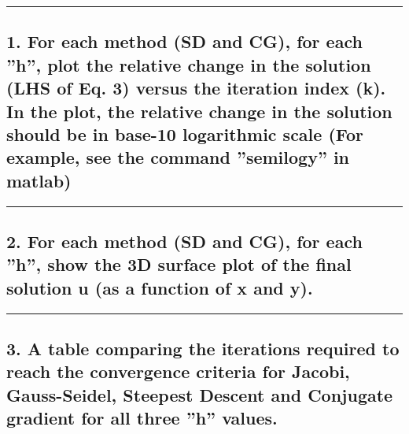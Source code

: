 \documentclass[11pt]{article}
\begin{document}
    \begin{center}\rule{0.5\linewidth}{0.5pt}\end{center}

    \hypertarget{for-each-method-sd-and-cg-for-each-h-plot-the-relative-change-in-the-solution-lhs-of-eq.-3-versus-the-iteration-index-k.-in-the-plot-the-relative-change-in-the-solution-should-be-in-base-10-logarithmic-scale-for-example-see-the-command-semilogy-in-matlab}{%
\subsection{1. For each method (SD and CG), for each ''h'', plot the
relative change in the solution (LHS of Eq. 3) versus the iteration
index (k). In the plot, the relative change in the solution should be in
base-10 logarithmic scale (For example, see the command ''semilogy'' in
matlab)}\label{for-each-method-sd-and-cg-for-each-h-plot-the-relative-change-in-the-solution-lhs-of-eq.-3-versus-the-iteration-index-k.-in-the-plot-the-relative-change-in-the-solution-should-be-in-base-10-logarithmic-scale-for-example-see-the-command-semilogy-in-matlab}}

    \begin{center}\rule{0.5\linewidth}{0.5pt}\end{center}

    \hypertarget{for-each-method-sd-and-cg-for-each-h-show-the-3d-surface-plot-of-the-final-solution-u-as-a-function-of-x-and-y.}{%
\subsection{2. For each method (SD and CG), for each ''h'', show the 3D
surface plot of the final solution u (as a function of x and
y).}\label{for-each-method-sd-and-cg-for-each-h-show-the-3d-surface-plot-of-the-final-solution-u-as-a-function-of-x-and-y.}}

    \begin{center}\rule{0.5\linewidth}{0.5pt}\end{center}

    \hypertarget{a-table-comparing-the-iterations-required-to-reach-the-convergence-criteria-for-jacobi-gauss-seidel-steepest-descent-and-conjugate-gradient-for-all-three-h-values.}{%
\subsection{3. A table comparing the iterations required to reach the
convergence criteria for Jacobi, Gauss-Seidel, Steepest Descent and
Conjugate gradient for all three ''h''
values.}\label{a-table-comparing-the-iterations-required-to-reach-the-convergence-criteria-for-jacobi-gauss-seidel-steepest-descent-and-conjugate-gradient-for-all-three-h-values.}}
\end{document}

